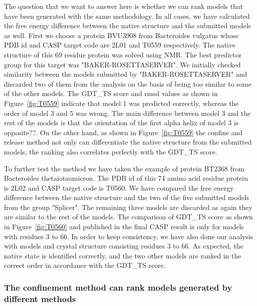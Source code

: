 \documentclass[12pt]{article}
\newcommand{\Alberto}[1]{\color{ForestGreen}#1\normalcolor }
\begin{document}
The question that we want to answer here is whether we can rank models that have been generated with
the same methodology. In all cases, we have calculated the free energy difference between the native
structure and the submitted models as well. 
First we choose a protein BVU3908 from Bacteroides vulgatus whose PDB id and CASP target code are
2L01 and T0559 respectively. The native structure of this 69 residue protein was solved using NMR.
The best predictor group for this target was "BAKER-ROSETTASERVER". We initially checked similarity
between the models submitted by "BAKER-ROSETTASERVER" and discarded two of them from the analysis on
the basis of being too similar to some of the other models. The GDT\_TS score and rmsd values as
shown in Figure~\ref{fig:T0559} indicate that model 1 was predicted correctly, whereas the order of
model 3 and 5 was wrong. The main difference between model 3 and the rest of the models is that the
orientation of the first alpha helix of model 3 is \Alberto{opposite??}. On the other hand, as shown
in Figure~\ref{fig:T0559} the confine and release method not only can differentiate the native
structure from the submitted models, the ranking also correlates perfectly with the GDT\_TS score.  

To further test the method we have taken the example of protein BT2368 from Bacteroides
thetaiotaomicron. The PDB id of this 74 amino acid residue protein is 2L02 and CASP target code is
T0560. We have compared the free energy difference between the native structure and the two of the
five submitted models from the group "Splicer". The remaining three models are discarded as again
they are similar to the rest of the models. The comparison of GDT\_TS score as shown in
Figure~\ref{fig:T0560} and published in the final CASP result is only for models with residues 3 to
66. In order to keep consistency, we have also done our analysis with models and crystal structure
consisting residues 3 to 66. As expected, the native state is identified correctly, and the two
other models are ranked in the correct order in accordance with the GDT\_TS score.   

\subsubsection{The confinement method can rank models generated by different methods}
\end{document}
